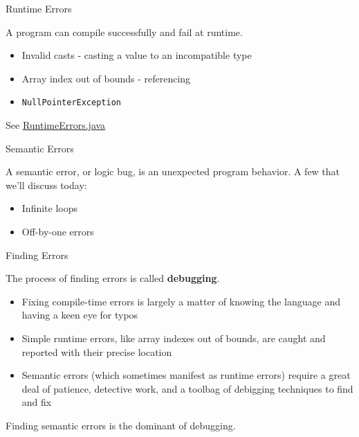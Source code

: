 \documentclass{beamer}
\newcommand{\code}{http://www.cc.gatech.edu/~simpkins/teaching/gatech/cs1331/code}
\begin{document}
\begin{frame}[fragile]{Runtime Errors}


A program can compile successfully and fail at runtime.
\begin{itemize}
\item Invalid casts - casting a value to an incompatible type
\item Array index out of bounds - referencing 
\item {\tt NullPointerException}
\end{itemize}

\vspace{.2in}
See \href{\code/RuntimeErrors.java}{RuntimeErrors.java}

\end{frame}

\begin{frame}[fragile]{Semantic Errors}


A semantic error, or logic bug,  is an unexpected program behavior. A few that we'll discuss today:

\begin{itemize}
\item Infinite loops
\item Off-by-one errors
\end{itemize}

\end{frame}

\begin{frame}[fragile]{Finding Errors}


The process of finding errors is called {\bf debugging}.

\begin{itemize}
\item Fixing compile-time errors is largely a matter of knowing the language and having a keen eye for typos
\item Simple runtime errors, like array indexes out of bounds, are caught and reported with their precise location
\item Semantic errors (which sometimes manifest as runtime errors) require a great deal of patience, detective work, and a toolbag of debigging techniques to find and fix
\end{itemize}

Finding semantic errors is the dominant of debugging.

\end{frame}
\end{document}
